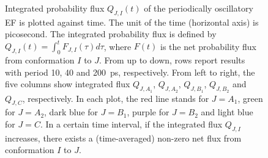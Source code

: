 \documentclass[a4paper,preprint,unsortedaddress,onecolumn]{revtex4-1}
\begin{document}
\begin{figure}
  \caption{
    Integrated probability flux $Q_{J,I}(t)$ of the periodically
    oscillatory EF is plotted against time. The unit of the
    time (horizontal axis) is picosecond.
    The integrated
    probability flux is defined by $Q_{J,I}(t) = \int_0^t F_{J,I}(\tau) d\tau$, where
    $F(t)$ is the net probability flux from conformation $I$ to $J$.
    From up to down, rows report results with  period 10, 40 and 200~ps, respectively.
    From left to right, the five
    columns show integrated flux $Q_{J,A_1}$, $Q_{J,A_2}$,
    $Q_{J,B_1}$, $Q_{J,B_2}$ and $Q_{J,C}$, respectively. In each plot,
    the red line stands for $J=A_1$, green for $J=A_2$, dark blue for $J=B_1$,
    purple for $J=B_2$ and light blue for $J=C$. In a certain time interval,
    if the integrated flux $Q_{J,I}$ increases, there exists a (time-averaged)
    non-zero net flux from conformation $I$ to $J$.
  }
  \label{fig:tmp10}
\end{figure}
\end{document}
